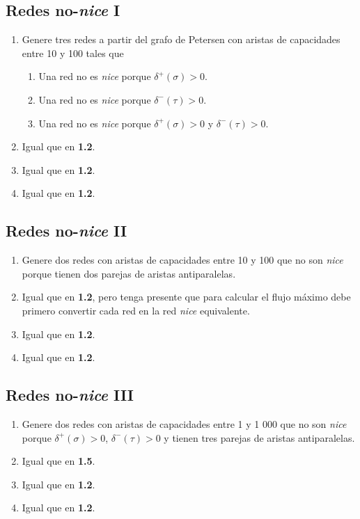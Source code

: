 \subsection{Redes no-\emph{nice} I}
\begin{enumerate}
	\item Genere tres redes a partir del grafo de Petersen con aristas de
		capacidades entre 10 y 100 tales que
		\begin{enumerate}
			\item Una red no es \emph{nice} porque
				$\delta^+(\sigma) > 0$.
			\item Una red no es \emph{nice} porque $\delta^-(\tau) > 0$.
			\item Una red no es \emph{nice} porque
				$\delta^+(\sigma) > 0$ y $\delta^-(\tau) > 0$.
		\end{enumerate}
	\item Igual que en \textbf{1.2}.
	\item Igual que en \textbf{1.2}.
	\item Igual que en \textbf{1.2}.
\end{enumerate}

\subsection{Redes no-\emph{nice} II}
\begin{enumerate}
	\item Genere dos redes con aristas de capacidades entre 10 y 100 que no son
		\emph{nice} porque tienen dos parejas de aristas antiparalelas.
	\item Igual que en \textbf{1.2}, pero tenga presente que para calcular el
		flujo máximo debe primero convertir cada red en la red \emph{nice}
		equivalente.
	\item Igual que en \textbf{1.2}.
	\item Igual que en \textbf{1.2}.
\end{enumerate}

\subsection{Redes no-\emph{nice} III}
\begin{enumerate}
	\item Genere dos redes con aristas de capacidades entre 1 y 1 000 que no son
		\emph{nice} porque $\delta^+(\sigma) > 0$, $\delta^-(\tau) > 0$ y
		tienen tres parejas de aristas antiparalelas.
	\item Igual que en \textbf{1.5}.
	\item Igual que en \textbf{1.2}.
	\item Igual que en \textbf{1.2}.
\end{enumerate}

